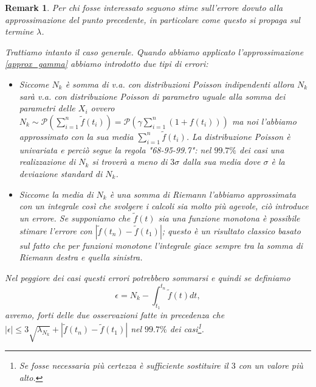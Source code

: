 \documentclass[10pt,a4paper]{report}
\newtheorem{remark}{Remark}
\begin{document}
\begin{remark}
Per chi fosse interessato seguono stime sull'errore dovuto alla approssimazione del punto precedente, in particolare come questo si propaga sul termine $\lambda$.

Trattiamo intanto il caso generale. Quando abbiamo applicato l'approssimazione \eqref{approx_gamma} abbiamo introdotto due tipi di errori:
\begin{itemize}
\item Siccome $N_k$ è somma di v.a. con distribuzioni Poisson indipendenti allora $N_k$ sarà v.a. con distribuzione Poisson di parametro uguale alla somma dei parametri delle $X_i$ ovvero $N_k\sim \mathcal{P}(\sum_{i=1}^n\tilde{f}(t_i))=\mathcal{P}(\gamma\sum_{i=1}^n(1+f(t_i)))$ ma noi l'abbiamo approssimato con la sua media $\sum_{i=1}^n\tilde{f}(t_i)$. La distribuzione Poisson è univariata e perciò segue la regola "68-95-99.7": nel $99.7\%$ dei casi una realizzazione di $N_k$ si troverà a meno di $3\sigma$ dalla sua media dove $\sigma$ è la deviazione standard di $N_k$.
\item Siccome la media di $N_k$ è una somma di Riemann l'abbiamo approssimata con un integrale così che svolgere i calcoli sia molto più agevole, ciò introduce un errore. Se supponiamo che $\tilde{f}(t)$ sia una funzione monotona è possibile stimare l'errore con $|\tilde{f}(t_n)-\tilde{f}(t_1)|$; questo è un risultato classico basato sul fatto che per funzioni monotone l'integrale giace sempre tra la somma di Riemann destra e quella sinistra.
\end{itemize}
Nel peggiore dei casi questi errori potrebbero sommarsi e quindi se definiamo 
$$
\epsilon = N_k - \int_{t_1}^{t_n}\tilde{f}(t)dt,
$$
avremo, forti delle due osservazioni fatte in precedenza che $|\epsilon|\leq3\sqrt{\lambda_{N_k}}+|\tilde{f}(t_n)-\tilde{f}(t_1)|$ nel $99.7\%$ dei casi\footnote{Se fosse necessaria più certezza è sufficiente sostituire il $3$ con un valore più alto.}.


\end{remark}
\end{document}
